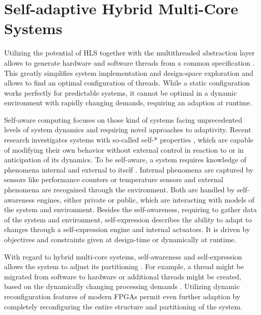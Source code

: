 \section{Self-adaptive Hybrid Multi-Core Systems}
Utilizing the potential of \ac{HLS} together with the multithreaded
abstraction layer allows to generate hardware and software threads from a
common specification \citep{CBN11}. This greatly simplifies system
implementation and design-space exploration and allows to find an optimal
configuration of threads. While a static configuration works perfectly for
predictable systems, it cannot be optimal in a dynamic environment with
rapidly changing demands, requiring an adaption at runtime.

Self-aware computing focuses on those kind of systems facing unprecedented
levels of system dynamics and requiring novel approaches to adaptivity. Recent
research investigates systems with so-called self-* properties \citep{SMC11},
which are capable of modifying their own behavior without external control in
reaction to or in anticipation of its dynamics. To be self-aware, a system
requires knowledge of phenomena internal and external to itself \citep{LCP11}.
Internal phenomena are captured by sensors like performance counters or
temperature sensors and external phenomena are recognized through the
environment. Both are handled by self-awareness engines, either private or
public, which are interacting with models of the system and environment.
Besides the self-awareness, requiring to gather data of the system and
environment, self-expression describes the ability to adapt to changes through
a self-expression engine and internal actuators. It is driven by objectives
and constraints given at design-time or dynamically at runtime.

With regard to hybrid multi-core systems, self-awareness and self-expression
allows the system to adjust its partitioning \citep{AHL14}. For example, a
thread might be migrated from software to hardware or additional threads might
be created, based on the dynamically changing processing demands
\citep{HLP09}. Utilizing dynamic reconfiguration features of modern \acp{FPGA}
permit even further adaption by completely reconfiguring the entire structure
and partitioning of the system.

